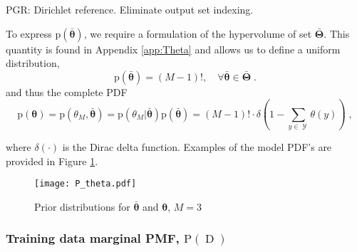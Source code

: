 \documentclass[12pt]{report}
\DeclareMathOperator{\Drm}{\mathrm{D}}
\DeclareMathOperator{\Ycal}{\mathcal{Y}}
\begin{document}
PGR: Dirichlet reference. Eliminate output set indexing.

To express $\text{p}\left(\bar{\bm{\theta}}\right)$, we require a formulation of the hypervolume of set $\bar{\bm{\Theta}}$. This quantity is found in Appendix \ref{app:Theta} and allows us to define a uniform distribution,
\begin{equation}
\text{p}\left(\bar{\bm{\theta}}\right)= (M-1)!,  \quad \forall \bar{\bm{\theta}} \in \bar{\bm{\Theta}} \;.
\end{equation}
and thus the complete PDF
\begin{equation}
\text{p}(\bm{\theta}) = \text{p}(\theta_M,\bar{\bm{\theta}}) = \text{p}\left( \theta_M | \bar{\bm{\theta}} \right) \text{p}\left(\bar{\bm{\theta}}\right)
= (M-1)! \cdot \delta\left( 1 - \sum_{y \in \Ycal} \theta(y) \right) \;,
\end{equation}

where $\delta(\cdot)$ is the Dirac delta function. Examples of the model PDF's are provided in Figure \ref{fig:P_theta}.

\begin{figure}
\centering
\texttt{[image: P\_theta.pdf]}
\caption{Prior distributions for $\bar{\bm{\theta}}$ and $\bm{\theta}$, $M=3$}
\label{fig:P_theta}
\end{figure}


\subsubsection{Training data marginal PMF, $\text{P}(\Drm)$}
\end{document}
